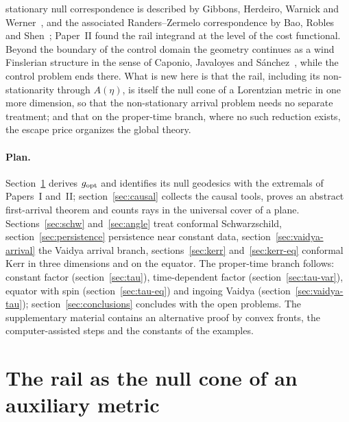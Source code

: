 \documentclass[aip,jmp,amsmath,amssymb,reprint]{revtex4-2}
\newcommand{\gopt}{g_{\rm opt}}
\theoremstyle{plain}
\theoremstyle{definition}
\begin{document}
stationary null correspondence is described by Gibbons, Herdeiro, Warnick and Werner~\cite{GibbonsRanders2009},
and the associated Randers--Zermelo correspondence by Bao, Robles and Shen~\cite{BaoRoblesShen}; Paper~II found
the rail integrand at the level of the cost functional. Beyond the boundary of the control domain the geometry continues as a wind Finslerian structure in the
sense of Caponio, Javaloyes and S\'anchez~\cite{CaponioWind}, while the control problem ends there. What is new here is that the rail, including its non-stationarity through $A(\eta)$, is
itself the null cone of a Lorentzian metric in one more dimension, so that the non-stationary
arrival problem needs no separate treatment; and that on the proper-time branch, where no such
reduction exists, the escape price organizes the global theory.

\paragraph{Plan.} Section~\ref{sec:aux} derives $\gopt$ and identifies its null geodesics with the
extremals of Papers~I and~II; section~\ref{sec:causal} collects the causal tools, proves an abstract
first-arrival theorem and counts rays in the universal cover of a plane. Sections~\ref{sec:schw}
and~\ref{sec:angle} treat conformal Schwarzschild, section~\ref{sec:persistence} persistence near constant
data, section~\ref{sec:vaidya-arrival} the Vaidya arrival branch, sections~\ref{sec:kerr} and~\ref{sec:kerr-eq} conformal Kerr in three
dimensions and on the equator. The proper-time branch follows: constant factor
(section~\ref{sec:tau}), time-dependent factor (section~\ref{sec:tau-var}), equator with spin
(section~\ref{sec:tau-eq}) and ingoing Vaidya (section~\ref{sec:vaidya-tau}); section~\ref{sec:conclusions}
concludes with the open problems. The supplementary
material contains an alternative proof by convex fronts, the computer-assisted steps and the constants of the
examples.

\section{The rail as the null cone of an auxiliary metric}
\label{sec:aux}
\end{document}
